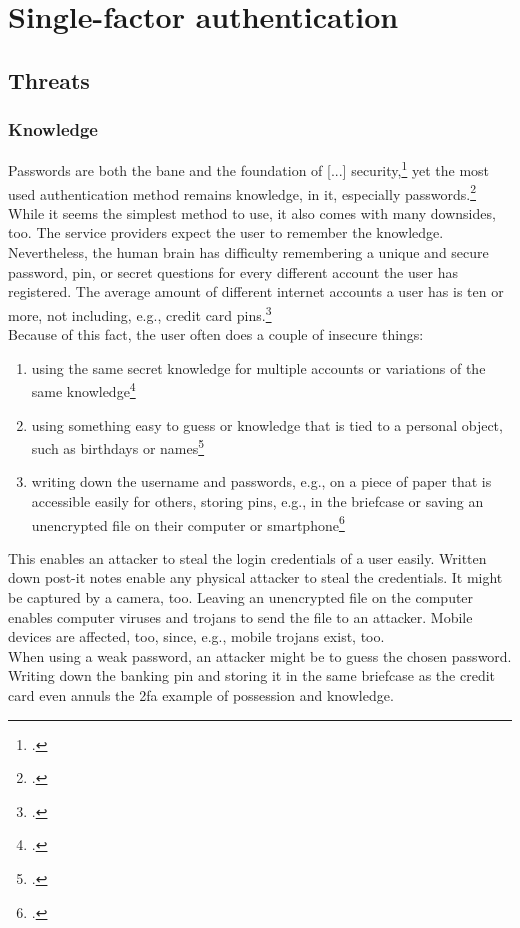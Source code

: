 \chapter{Single-factor authentication}

\section{Threats}
\label{sec:one-factor-threats}

\subsection{Knowledge}

\frqq Passwords are both the bane and the foundation of [...] security\flqq{},\footcite[206]{517355} yet the most used authentication method remains knowledge, in \gls{it}, especially passwords.\footcite[See][424]{320284} While it seems the simplest method to use, it also comes with many downsides, too. The service providers expect the user to remember the knowledge. Nevertheless, the human brain has difficulty remembering a unique and secure password, \gls{pin}, or secret questions for every different account the user has registered. The average amount of different internet accounts a user has is ten or more, not including, e.g., credit card \glspl{pin}.\footcites[See][7, 9]{lastpass}\\
Because of this fact, the user often does a couple of insecure things:

\begin{enumerate}[label=(\alph*)]
	\item using the same secret knowledge for multiple accounts or variations of the same knowledge\footcites[See][8]{yougov}[See][14]{sweden-passwords}[See][7]{lastpass}
	\item using something easy to guess or knowledge that is tied to a personal object, such as birthdays or names\footcites[See][]{web-de-passwords}[See][34]{anderson2008security}
	\item writing down the username and passwords, e.g., on a piece of paper that is accessible easily for others, storing \glspl{pin}, e.g., in the briefcase or saving an unencrypted file on their computer or smartphone\footcites[See][]{web-de-passwords}[See][6]{yougov2}

\end{enumerate}

This enables an attacker to steal the login credentials of a user easily. Written down post-it notes enable any physical attacker to steal the credentials. It might be captured by a camera, too. Leaving an unencrypted file on the computer enables computer viruses and trojans to send the file to an attacker. Mobile devices are affected, too, since, e.g., mobile trojans exist, too.\\
When using a weak password, an attacker might be to guess the chosen password. Writing down the banking \gls{pin} and storing it in the same briefcase as the credit card even annuls the \gls{2fa} example of possession and knowledge.

